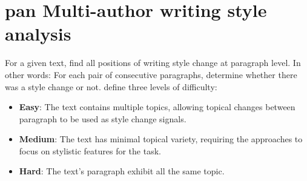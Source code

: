 \section{\acs{pan} Multi-author writing style analysis}
\label{sec:pan_multi_author_writing_style_analysis}

For a given text, find all positions of writing style change at paragraph level.
In other words: For each pair of consecutive paragraphs, determine whether there was a style change or not.
\citet{zangerle_overview_2024} define three levels of difficulty:
\begin{itemize}
    \item \textbf{Easy}: The text contains multiple topics, 
    allowing topical changes between paragraph to be used as style change signals.
    \item \textbf{Medium}: The text has minimal topical variety, 
    requiring the approaches to focus on stylistic features for the task.
    \item \textbf{Hard}: The text's paragraph exhibit all the same topic.
\end{itemize}